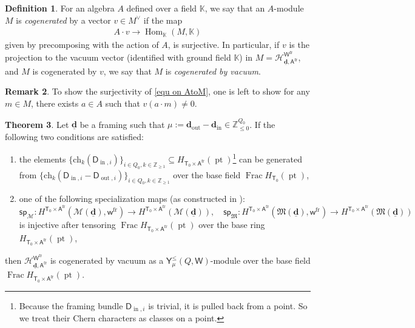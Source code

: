 \documentclass[10pt]{amsart}
\theoremstyle{definition}
\newtheorem{Theorem}{Theorem}[section]
\newtheorem{Definition}[Theorem]{Definition}
\newtheorem{Remark}[Theorem]{Remark}
\numberwithin{equation}{section}
\newcommand{\bK}{\mathbb{K}}
\newcommand{\bZ}{\mathbb{Z}}
\newcommand{\bd}{\mathbf{d}}
\newcommand{\cH}{\mathcal{H}}
\newcommand{\cM}{\mathcal{M}}
\newcommand{\fM}{\mathfrak{M}}
\newcommand{\sA}{\mathsf{A}}
\newcommand{\sT}{\mathsf{T}}
\newcommand{\sW}{\mathsf{W}}
\newcommand{\sw}{\mathsf{w}}
\newcommand{\Frac}{\operatorname{Frac}}
\newcommand{\Hom}{\operatorname{Hom}}
\newcommand{\pt}{\operatorname{pt}}
\newcommand{\In}{\operatorname{in}}
\newcommand{\Out}{\operatorname{out}}
\begin{document}
\begin{Definition}
For an algebra $A$ defined over a field $\bK$, we say that an $A$-module $M$ is \textit{cogenerated} by a vector $v\in M^{\vee}$ if the map
\begin{align}\label{equ on AtoM}
    A\cdot v\to \Hom_{\bK}(M,\bK)
\end{align}
given by precomposing with the action of $A$, is surjective. In particular, if $v$ is the projection to the vacuum vector (identified with ground field $\bK$) in $M=\cH^{\sW^{\mathrm{fr}}}_{\underline{\bd},\sA^{\mathrm{fr}}}$, and $M$ is cogenerated by $v$, we say that $M$ is \textit{cogenerated by vacuum}.

\end{Definition}
\begin{Remark}
To show the surjectivity of \eqref{equ on AtoM}, one is left to show for any $m\in M$, there exists $a\in A$ such that $v(a\cdot m)\neq 0$. 
\end{Remark}
\begin{Theorem}\label{thm vac cogen_general}
Let $\underline{\bd}$ be a framing such that $\mu:=\bd_{\Out}-\bd_{\In}\in \bZ_{\leqslant0}^{Q_0}$. If the following two conditions are satisfied:
\begin{enumerate}
    \item[(i)] the elements $\{\mathrm{ch}_k(\mathsf D_{\In,i})\}_{i\in Q_0,k\in \bZ_{\geqslant 1}}\subseteq H_{\sT_0\times \sA^{\mathrm{fr}}}(\pt)$\footnote{Because the framing bundle $\mathsf D_{\In,i}$ is trivial, it is pulled back from a point. So we treat their Chern characters as classes on a point.} can be generated from $\{\mathrm{ch}_k(\mathsf D_{\In,i}-\mathsf D_{\Out,i})\}_{i\in Q_0,k\in \bZ_{\geqslant 1}}$ over the base field $\Frac H_{\sT_0}(\pt)$,
    \item[(ii)] one of the following specialization maps (as constructed in \cite[Ex.~7.19]{COZZ}):
    $$\mathsf{sp}_{\cM}\colon H^{\sT_0\times \sA^{\mathrm{fr}}}(\cM(\underline{\bd}),\sw^{\mathrm{fr}})\to H^{\sT_0\times \sA^{\mathrm{fr}}}(\cM(\underline{\bd})), \quad
   \mathsf{sp}_{\fM}\colon H^{\sT_0\times \sA^{\mathrm{fr}}}(\fM(\underline{\bd}),\sw^{\mathrm{fr}})\to H^{\sT_0\times \sA^{\mathrm{fr}}}(\fM(\underline{\bd}))$$ 
  is injective after tensoring $\Frac H_{\sT_0\times \sA^{\mathrm{fr}}}(\pt)$ over the base ring $H_{\sT_0\times \sA^{\mathrm{fr}}}(\pt)$,
\end{enumerate}
then $\cH^{\sW^{\mathrm{fr}}}_{\underline{\bd},\sA^{\mathrm{fr}}}$ is cogenerated by vacuum as a $\mathsf Y_{\mu}^{\leqslant}(Q,\sW)$-module over the base field $\Frac H_{\sT_0\times \sA^{\mathrm{fr}}}(\pt)$.
\end{Theorem}
\end{document}

